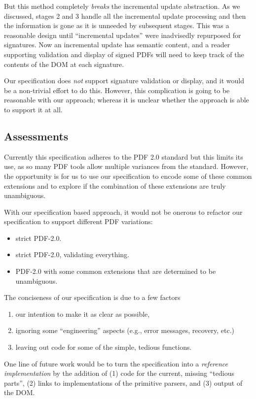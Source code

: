 But this method completely \emph{breaks} the incremental update
abstraction.  As we discussed, stages 2 and 3 handle all
the incremental update processing and then the information is gone as
it is unneeded by subsequent stages.
% 
This was a reasonable design until ``incremental updates'' were
inadvisedly repurposed for signatures.  Now an incremental update has
semantic content, and a reader supporting validation and display of
signed PDFs will need to keep track of the contents of the DOM at each
signature.

Our specification does \emph{not} support signature validation or
display, and it would be a non-trivial effort to do this.  However,
this complication is going to be reasonable with our \ssp{} approach;
whereas it is unclear whether the \dsp{} approach is able to support
it at all.

\subsection{Assessments}

Currently this specification adheres to the PDF 2.0 standard but this
limits its use, as so many PDF tools allow multiple variances from the
standard.
%
However, the opportunity is for us to use our specification to encode
some of these common extensions and to explore if the combination of
these extensions are truly unambiguous.

With our specification based approach, it would not be onerous
to refactor our specification to support different PDF variations:
\begin{itemize}
\item strict PDF-2.0.
\item strict PDF-2.0, validating everything.
\item PDF-2.0 with some common extensions that are determined to be unambiguous.
\end{itemize}

The conciseness of our specification is due to a few factors
\begin{enumerate}
\item our intention to make it as clear as possible,
\item ignoring some ``engineering'' aspects (e.g., error
   messages, recovery, etc.)
\item leaving out code for some of the simple, tedious functions.
\end{enumerate}
One line of future work would be to turn the specification into a
\emph{reference implementation} by the addition of
(1) code for the current, missing ``tedious parts'',
(2) links to implementations of the primitive parsers, and
(3) output of the DOM.

